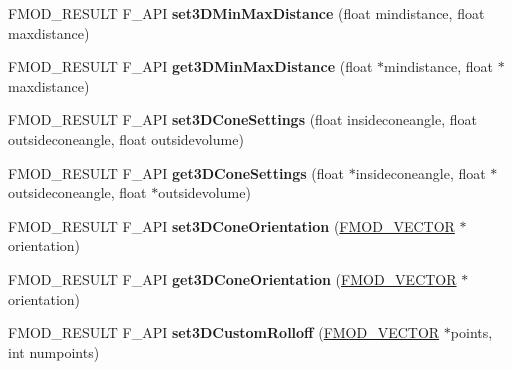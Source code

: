 \begin{DoxyCompactItemize}
\item 
\hypertarget{class_f_m_o_d_1_1_channel_control_abdf3cebe9997771b6844819ee7eb85e9}{F\+M\+O\+D\+\_\+\+R\+E\+S\+U\+L\+T F\+\_\+\+A\+P\+I {\bfseries set3\+D\+Min\+Max\+Distance} (float mindistance, float maxdistance)}\label{class_f_m_o_d_1_1_channel_control_abdf3cebe9997771b6844819ee7eb85e9}

\item 
\hypertarget{class_f_m_o_d_1_1_channel_control_ab8dadcd83013ea4826bd8e44cb73ebc5}{F\+M\+O\+D\+\_\+\+R\+E\+S\+U\+L\+T F\+\_\+\+A\+P\+I {\bfseries get3\+D\+Min\+Max\+Distance} (float $\ast$mindistance, float $\ast$maxdistance)}\label{class_f_m_o_d_1_1_channel_control_ab8dadcd83013ea4826bd8e44cb73ebc5}

\item 
\hypertarget{class_f_m_o_d_1_1_channel_control_ab65692317899c31d68e84cb1127840ff}{F\+M\+O\+D\+\_\+\+R\+E\+S\+U\+L\+T F\+\_\+\+A\+P\+I {\bfseries set3\+D\+Cone\+Settings} (float insideconeangle, float outsideconeangle, float outsidevolume)}\label{class_f_m_o_d_1_1_channel_control_ab65692317899c31d68e84cb1127840ff}

\item 
\hypertarget{class_f_m_o_d_1_1_channel_control_a2189e119ad2569ffdc58396deb9f8967}{F\+M\+O\+D\+\_\+\+R\+E\+S\+U\+L\+T F\+\_\+\+A\+P\+I {\bfseries get3\+D\+Cone\+Settings} (float $\ast$insideconeangle, float $\ast$outsideconeangle, float $\ast$outsidevolume)}\label{class_f_m_o_d_1_1_channel_control_a2189e119ad2569ffdc58396deb9f8967}

\item 
\hypertarget{class_f_m_o_d_1_1_channel_control_a593550467390c1786ca195d1092010b1}{F\+M\+O\+D\+\_\+\+R\+E\+S\+U\+L\+T F\+\_\+\+A\+P\+I {\bfseries set3\+D\+Cone\+Orientation} (\hyperlink{struct_f_m_o_d___v_e_c_t_o_r}{F\+M\+O\+D\+\_\+\+V\+E\+C\+T\+O\+R} $\ast$orientation)}\label{class_f_m_o_d_1_1_channel_control_a593550467390c1786ca195d1092010b1}

\item 
\hypertarget{class_f_m_o_d_1_1_channel_control_ac38d4525218249954c2efc5d55cec048}{F\+M\+O\+D\+\_\+\+R\+E\+S\+U\+L\+T F\+\_\+\+A\+P\+I {\bfseries get3\+D\+Cone\+Orientation} (\hyperlink{struct_f_m_o_d___v_e_c_t_o_r}{F\+M\+O\+D\+\_\+\+V\+E\+C\+T\+O\+R} $\ast$orientation)}\label{class_f_m_o_d_1_1_channel_control_ac38d4525218249954c2efc5d55cec048}

\item 
\hypertarget{class_f_m_o_d_1_1_channel_control_abf2c27cef2ec7500559855aa270b8669}{F\+M\+O\+D\+\_\+\+R\+E\+S\+U\+L\+T F\+\_\+\+A\+P\+I {\bfseries set3\+D\+Custom\+Rolloff} (\hyperlink{struct_f_m_o_d___v_e_c_t_o_r}{F\+M\+O\+D\+\_\+\+V\+E\+C\+T\+O\+R} $\ast$points, int numpoints)}\label{class_f_m_o_d_1_1_channel_control_abf2c27cef2ec7500559855aa270b8669}


\end{DoxyCompactItemize}
